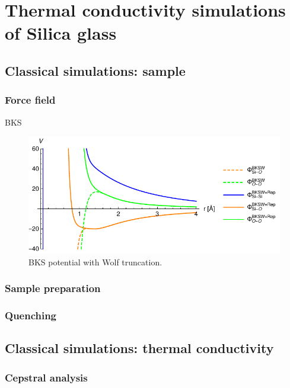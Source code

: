 \chapter{Thermal conductivity simulations of Silica glass}


\section{Classical simulations: sample}

\subsection{Force field}
BKS
\begin{figure}
    \centering
    \includegraphics[]{chapters/chapter6/figures/BKSW.pdf}
    \caption{BKS potential with Wolf truncation.}
    \label{fig:BKS-potential}
\end{figure}

\subsection{Sample preparation}

\subsection{Quenching}

\section{Classical simulations: thermal conductivity}

\subsection{Cepstral analysis}
